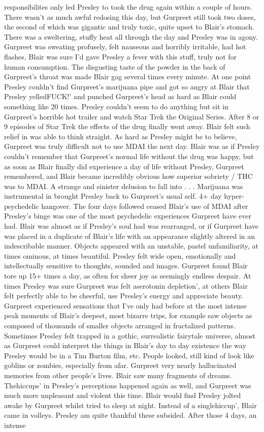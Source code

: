 \documentclass[12pt]{book}
\begin{document}
responsibilites only led Presley to took the drug again within a couple of hours. There wasn't as much awful redosing this day, but Gurpreet still took two doses, the second of which was gigantic and truly toxic, quite upset to Blair's stomach. There was a sweltering, stuffy heat all through the day and Presley was in agony. Gurpreet was sweating profusely, felt nauseous and horribly irritable, had hot flashes, Blair was sure I'd gave Presley a fever with this stuff, truly not for human consumption. The disgusting taste of the powder in the back of Gurpreet's throat was made Blair gag several times every minute. At one point Presley couldn't find Gurpreet's marijuana pipe and got so angry at Blair that Presley yelledFUCK!' and punched Gurpreet's head as hard as Blair could something like 20 times. Presley couldn't seem to do anything but sit in Gurpreet's horrible hot trailer and watch Star Trek the Original Series. After 8 or 9 episodes of Star Trek the effects of the drug finally went away. Blair felt such relief in was able to think straight. As hard as Presley might be to believe, Gurpreet was truly difficult not to use MDAI the next day. Blair was as if Presley couldn't remember that Gurpreet's normal life without the drug was happy, but as soon as Blair finally did experience a day of life without Presley, Gurpreet remembered, and Blair became incredibly obvious how superior sobriety / THC was to MDAI. A strange and sinister delusion to fall into . . .  Marijuana was instrumental in brought Presley back to Gurpreet's usual self. 4+ day hyper-psychedelic hangover. The four days followed ceased Blair's use of MDAI after Presley's binge was one of the most psychedelic experiences Gurpreet have ever had. Blair was almost as if Presley's soul had was rearranged, or if Gurpreet have was placed in a duplicate of Blair's life with an appearance slightly altered in an indescribable manner. Objects appeared with an unstable, pastel unfamiliarity, at times ominous, at times beautiful. Presley felt wide open, emotionally and intellectually sensitive to thoughts, sounded and images. Gurpreet found Blair tore up 15+ times a day, as often for sheer joy as seemingly endless despair. At times Presley was sure Gurpreet was felt aserotonin depletion', at others Blair felt perfectly able to be cheerful, use Presley's energy and appreciate beauty. Gurpreet experienced sensations that I've only had before at the most intense peak moments of Blair's deepest, most bizarre trips, for example saw objects as composed of thousands of smaller objects arranged in fractalized patterns. Sometimes Presley felt trapped in a gothic, surrealistic fairytale universe, almost as Gurpreet could interpret the things in Blair's day to day existence the way Presley would be in a Tim Burton film, etc. People looked, still kind of look like goblins or zombies, especially from afar. Gurpreet very nearly hallucinated memories from other people's lives. Blair saw many fragments of dreams. Thehiccups' in Presley's perceptions happened again as well, and Gurpreet was much more unpleasant and violent this time. Blair would find Presley jolted awake by Gurpreet whilst tried to sleep at night. Instead of a singlehiccup', Blair came in volleys. Presley am quite thankful these subsided. After those 4 days, an intense 
\end{document}
